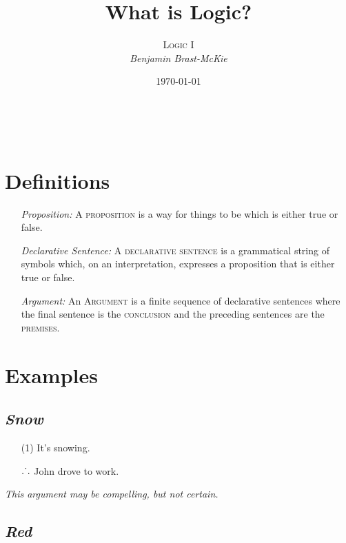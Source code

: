 \documentclass[a4paper, 11pt]{article} %
\title{\textbf{What is Logic?}} %
\author{\textsc{Logic I}\\ \em Benjamin Brast-McKie} %
\date{\today} %
\makeatletter
\def\therefore{\ensuremath{\ldotp\dot{}\,\ldotp}}
\renewcommand{\maketitle}{ %
\begin{flushright} %
{\LARGE\@title} %

\vspace{10pt} %

{\@author} %
\\\@date %

\vspace{30pt} %
\end{flushright}
}
\makeatother
\begin{document}
\maketitle %

\thispagestyle{empty}


\section*{Definitions}

\begin{enumerate}[leftmargin=1.5in,labelsep=.15in] %
  \item[\it Proposition:] A \textsc{proposition} is a way for things to be which is either true or false.
  \item[\it Declarative Sentence:]  A \textsc{declarative sentence} is a grammatical string of symbols which, on an interpretation, expresses a proposition that is either true or false.
  \item[\it Argument:] An \textsc{Argument} is a finite sequence of declarative sentences where the final sentence is the \textsc{conclusion} and the preceding sentences are the \textsc{premises}.
\end{enumerate}



\section*{Examples}

\subsection*{\it \textbf{Snow}}

\begin{enumerate}
  \item[(1)] It's snowing.
  \item[\therefore] John drove to work.
\end{enumerate}

\noindent
\textit{This argument may be compelling, but not certain.}

\subsection*{\it \textbf{Red}}
\end{document}
